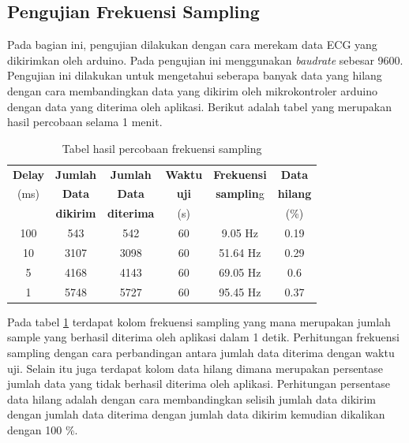 \documentclass[conference]{IEEEtran}
\begin{document}
	\subsection{Pengujian Frekuensi Sampling}
	\vspace{1ex}
	Pada bagian ini, pengujian dilakukan dengan cara merekam data ECG yang dikirimkan oleh arduino. Pada pengujian ini menggunakan \textit{baudrate} sebesar 9600. Pengujian ini dilakukan untuk mengetahui seberapa banyak data yang hilang dengan cara membandingkan data yang dikirim oleh mikrokontroler arduino dengan data yang diterima oleh aplikasi. Berikut adalah tabel yang merupakan hasil percobaan selama 1 menit.
	\begin{table}[h]
		\begin{tabular}{|c|c|c|c|c|c|}
			\hline
			\multicolumn{1}{|c|}{{\color[HTML]{000000} \textbf{Delay}}} & \multicolumn{1}{|c|}{\textbf{Jumlah}} &
			\multicolumn{1}{|c|}{ \textbf{Jumlah}} &
			\multicolumn{1}{|c|}{\textbf{Waktu}} &
			\multicolumn{1}{|c|}{\textbf{Frekuensi}} &
			\multicolumn{1}{|c|}{\textbf{Data}} \\
			(ms) & \textbf{Data} & \textbf{Data} & \textbf{uji} & \textbf{samplin}g & \textbf{hilang } \\
			& \textbf{dikirim} & \textbf{diterima} & (s)  &  & (\%) \\ \hline
			100 & 543 & 542 & 60 & 9.05 Hz & 0.19 \\ \hline 
			10 & 3107 & 3098 & 60 & 51.64 Hz & 0.29 \\ \hline
			5 & 4168 & 4143 & 60 & 69.05 Hz & 0.6 \\ \hline
			1 & 5748 & 5727 & 60 & 95.45 Hz & 0.37 \\ \hline
			
		\end{tabular}
		\vspace{1ex}
		\caption{Tabel hasil percobaan frekuensi sampling}
		\label{tabel:4.1}
	\end{table}
	
	Pada tabel \ref{tabel:4.1} terdapat kolom frekuensi sampling yang mana merupakan jumlah sample yang berhasil diterima oleh aplikasi dalam 1 detik. Perhitungan frekuensi sampling dengan cara perbandingan antara jumlah data diterima dengan waktu uji. Selain itu juga terdapat kolom data hilang dimana merupakan persentase jumlah data yang tidak berhasil
	diterima oleh aplikasi. Perhitungan persentase data hilang adalah dengan cara membandingkan selisih jumlah data dikirim dengan jumlah data diterima dengan jumlah data dikirim kemudian dikalikan dengan 100 \%.
	
\end{document}
